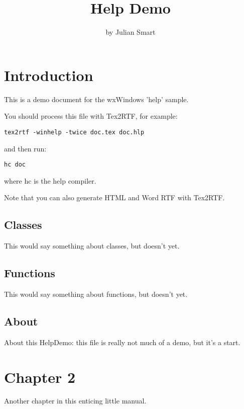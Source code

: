 %
\parskip=10pt%
\parindent=0pt%
\title{Help Demo}%
\author{by Julian Smart}%
\makeindex%
%
\maketitle%
\pagestyle{fancyplain}%
%
%
%
\setfooter{\thepage}{}{}{}{}{\thepage}%
\tableofcontents%

\chapter{Introduction}\label{intro}
%
%
\setfooter{\thepage}{}{}{}{}{\thepage}%

This is a demo document for the wxWindows 'help' sample.

You should process this file with Tex2RTF, for example:

{\tt tex2rtf -winhelp -twice doc.tex doc.hlp}

and then run:

{\tt hc doc}

where hc is the help compiler.

Note that you can also generate HTML and Word RTF with Tex2RTF.

\section{Classes}\label{classes}

This would say something about classes, but doesn't yet.

\section{Functions}\label{functions}

This would say something about functions, but doesn't yet.

\section{About}\label{about}

About this HelpDemo: this file is really not much of a demo, but it's a start.

\chapter{Chapter 2}\label{chapter2}
%
%
\setfooter{\thepage}{}{}{}{}{\thepage}%

Another chapter in this enticing little manual.

%
\setfooter{\thepage}{}{}{}{}{\thepage}%
\printindex%


